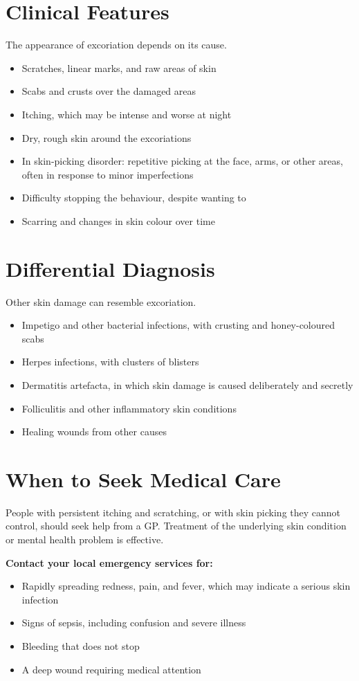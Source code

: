 \section*{Clinical Features}
The appearance of excoriation depends on its cause.
\begin{itemize}
    \item Scratches, linear marks, and raw areas of skin
    \item Scabs and crusts over the damaged areas
    \item Itching, which may be intense and worse at night
    \item Dry, rough skin around the excoriations
    \item In skin-picking disorder: repetitive picking at the face, arms, or other areas, often in response to minor imperfections
    \item Difficulty stopping the behaviour, despite wanting to
    \item Scarring and changes in skin colour over time
\end{itemize}

\section*{Differential Diagnosis}
Other skin damage can resemble excoriation.
\begin{itemize}
    \item Impetigo and other bacterial infections, with crusting and honey-coloured scabs
    \item Herpes infections, with clusters of blisters
    \item Dermatitis artefacta, in which skin damage is caused deliberately and secretly
    \item Folliculitis and other inflammatory skin conditions
    \item Healing wounds from other causes
\end{itemize}

\section*{When to Seek Medical Care}
People with persistent itching and scratching, or with skin picking they cannot control, should seek help from a GP. Treatment of the underlying skin condition or mental health problem is effective.

\textbf{Contact your local emergency services for:}
\begin{itemize}
    \item Rapidly spreading redness, pain, and fever, which may indicate a serious skin infection
    \item Signs of sepsis, including confusion and severe illness
    \item Bleeding that does not stop
    \item A deep wound requiring medical attention
\end{itemize}

